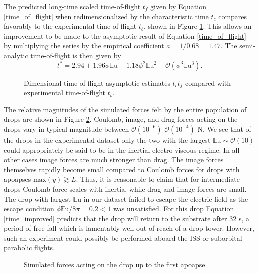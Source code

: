 \documentclass[12pt,a4paper,oneside]{book}
\begin{document}
The predicted long-time scaled time-of-flight $t_f$ given by Equation \ref{time_of_flight} when redimensionalized by the characteristic time $t_c$ compares favorably to the experimental time-of-flight $t_b$, shown in Figure \ref{fig:times2}. This allows an improvement to be made to the asymptotic result of Equation \ref{time_of_flight} by multiplying the series by the empirical coefficient $a = 1/0.68 = 1.47$. The semi-analytic time-of-flight is then given by
\begin{equation}
\label{time_improved}
t^* = 2.94 + 1.96\phi\mathbb{E}\mbox{u} + 1.18\phi^2\mathbb{E}\mbox{u}^{2} + \mathcal{O}(\phi^3\mathbb{E}\mbox{u}^{3}).
\end{equation}
\begin{figure}[htb]
    \centering
    
    \caption{Dimensional time-of-flight asymptotic estimates $t_c t_f$ compared with experimental time-of-flight $t_b$.\label{fig:times2}}
\end{figure}
The relative magnitudes of the simulated forces felt by the entire population of drops are shown in Figure \ref{fig:forces}. Coulomb, image, and drag forces acting on the drops vary in typical magnitude between $\mathcal{O}(10^{-6})$-$\mathcal{O}(10^{-4})$ N. We see that of the drops in the experimental dataset only the two with the largest $\mathbb{E}\mbox{u} \sim \mathcal{O}(10)$ could appropriately be said to be in the inertial electro-viscous regime. In all other cases image forces are much stronger than drag. The image forces themselves rapidly become small compared to Coulomb forces for drops with apoapses $\mbox{max}\left( y\right) \gtrsim L$. Thus, it is reasonable to claim that for intermediate drops Coulomb force scales with inertia, while drag and image forces are small. The drop with largest $\mathbb{E}\mbox{u}$ in our dataset failed to escape the electric field as the escape condition $\phi \mathbb{E}\mbox{u} / 8\pi = 0.2 < 1$ was unsatisfied. For this drop Equation \ref{time_improved} predicts that the drop will return to the substrate after 32 s, a period of free-fall which is lamentably well out of reach of a drop tower. However, such an experiment could possibly be performed aboard the ISS or suborbital parabolic flights.
\begin{figure}[!htb]
    \centering
    \resizebox{14cm}{!}{}
    \caption{Simulated forces acting on the drop up to the first apoapse.\label{fig:forces}}
\end{figure}
\end{document}
